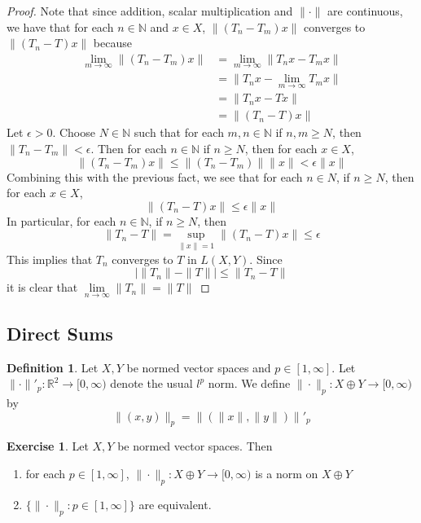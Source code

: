 \documentclass[12pt]{amsart}
\theoremstyle{definition}
\newtheorem{defn}[definition]{Definition}
\newtheorem{ex}[definition]{Exercise}
\newcommand{\ep}{\epsilon}
\newcommand{\N}{\mathbb{N}}
\newcommand{\R}{\mathbb{R}}
\newcommand{\Rg}{[0,\infty)}
\newcommand{\limn}{\lim \limits_{n \rightarrow \infty}}
\newcommand{\lex}[1]{\label{ex:#1}}
\newcommand{\ld}[1]{\label{defn:#1}}
\begin{document}
\begin{proof}
		Note that since addition, scalar multiplication and $\|\cdot \|$ are continuous, we have that for each $n \in \N$ and $x \in X$, $\|(T_n-T_m)x \|$ converges to $\|(T_n-T)x \|$ because 
		\begin{align*}
			\lim_{m \rightarrow \infty} \|(T_n-T_m)x \|
			&= \lim_{m \rightarrow \infty} \|T_nx-T_mx \|\\
			&= \|T_nx-\lim_{m \rightarrow \infty}T_mx \|\\
			&=\|T_nx-Tx \|\\
			&= \|(T_n-T)x \|
		\end{align*} 
		Let $\ep >0 $. Choose $N \in \N$ such that for each $m, n \in \N$ if $n,m \geq N$, then $\|T_n - T_m \|< \ep$. Then for each $n \in \N$ if $n \geq N$, then for each $x \in X$, $$\|(T_n-T_m)x\|\leq \|(T_n-T_m)\|\|x \|< \ep \|x\|$$ Combining this with the previous fact, we see that for each $n \in N$, if $n \geq N$, then for each $x \in X$, $$\|(T_n -T) x\|\leq \ep \|x \|$$ In particular, for each $n \in \N$, if $n \geq N$, then $$ \|T_n -T \|= \sup\limits_{\|x \|= 1}\|(T_n - T)x \|\leq \ep$$ This implies that $T_n$ converges to $T$ in $L(X,Y)$. 
		Since $$\big\vert \|T_n \|- \|T \|\big \vert \leq \|T_n - T \|$$ it is clear that $\limn \|T_n \|= \|T \|$
	\end{proof}
	
	
	
	
	
	
	
	
	
	
	
	
	
	
	
	
	
	
	
	
	
	
	
	
	\newpage
	\subsection{Direct Sums}
	
	\begin{defn} \ld{}
	Let $X, Y$ be normed vector spaces and $p \in [1, \infty]$. Let $\| \cdot \|'_p: \R^2 \rightarrow [0, \infty)$ denote the usual $l^p$ norm. We define $\| \cdot \|_p : X \oplus Y \rightarrow \Rg$ by $$\|(x, y) \|_p = \|( \|x\|, \| y \|) \|'_ p$$
	\end{defn}
	
	\begin{ex} \lex{}	
	Let $X, Y$  be normed vector spaces. Then 
	\begin{enumerate}
	\item for each $p \in [1, \infty]$, $\|\cdot\|_p: X \oplus Y \rightarrow \Rg$ is a norm on $X \oplus Y$
	\item  $\{\|\cdot \|_p:  p \in [1, \infty]\}$ are equivalent. 
	\end{enumerate}
	\end{ex}
	
\end{document}
